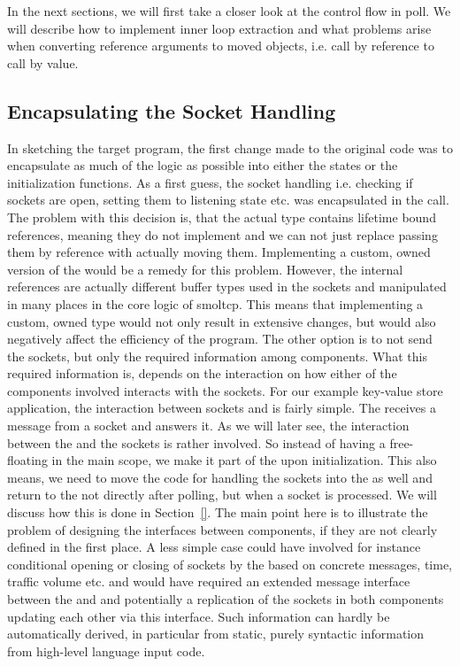 In the next sections, we will first take a closer look at the control flow in poll. We will describe how to implement inner loop extraction and what problems arise when converting reference arguments to moved objects, i.e. call by reference to call by value.

\subsection{Encapsulating the Socket Handling}
\label{subsec:SocketHandling}
In sketching the target program, the first change made to the original code was to encapsulate as much of the logic as possible into either the states or the initialization functions. As a first guess, the socket handling i.e. checking if sockets are open, setting them to listening state etc. was encapsulated in the  call. The problem with this decision is, that the actual  type contains lifetime bound references, meaning they do not implement  and we can not just replace passing them by reference with actually moving them. Implementing a custom, owned version of the  would be a remedy for this problem. However, the internal references are actually different buffer types used in the sockets and manipulated in many places in the core logic of smoltcp. This means that implementing a custom, owned  type would not only result in extensive changes, but would also negatively affect the efficiency of the program. The other option is to not send the sockets, but only the required information among components. What this required information is, depends on the interaction on how either of the components involved interacts with the sockets. For our example key-value store application, the interaction between sockets and \store{} is fairly simple. The \store{} receives a message from a socket and answers it. As we will later see, the interaction between the \stack{} and the sockets is rather involved. So instead of having a free-floating  in the main scope, we make it part of the \stack{} upon initialization. This also means, we need to move the code for handling the sockets into the \stack{} as well and return to the \store{} not directly after polling, but when a socket is processed. We will discuss how this is done in Section~\ref{}. The main point here is to illustrate the problem of designing the interfaces between components, if they are not clearly defined in the first place. A less simple case could have involved for instance conditional opening or closing of sockets by the \store{} based on concrete messages, time, traffic volume etc. and would have required an extended message interface between the \stack{} and \store{} and potentially a replication of the sockets in both components updating each other via this interface. Such information can hardly be automatically derived, in particular from static, purely syntactic information from high-level language input code.


